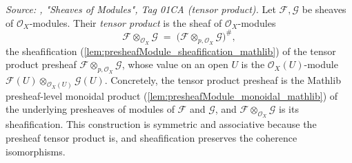 \begin{definition}\leanok
  \label{def:sheafTensorObj}
  \textit{Source: \cite{stacks-project}, "Sheaves of Modules", Tag 01CA (tensor
  product).}
  Let \(\mathcal{F}, \mathcal{G}\) be sheaves of \(\mathcal{O}_X\)-modules. Their
  \emph{tensor product} is the sheaf of \(\mathcal{O}_X\)-modules
  \[
    \mathcal{F} \otimes_{\mathcal{O}_X} \mathcal{G}
      \;=\; \bigl(\mathcal{F} \otimes_{p,\mathcal{O}_X} \mathcal{G}\bigr)^{\#},
  \]
  the sheafification (\cref{lem:presheafModule_sheafification_mathlib}) of the
  tensor product presheaf \(\mathcal{F} \otimes_{p,\mathcal{O}_X} \mathcal{G}\),
  whose value on an open \(U\) is the \(\mathcal{O}_X(U)\)-module
  \(\mathcal{F}(U) \otimes_{\mathcal{O}_X(U)} \mathcal{G}(U)\). Concretely, the
  tensor product presheaf is the Mathlib presheaf-level monoidal product
  (\cref{lem:presheafModule_monoidal_mathlib}) of the underlying presheaves of
  modules of \(\mathcal{F}\) and \(\mathcal{G}\), and
  \(\mathcal{F} \otimes_{\mathcal{O}_X} \mathcal{G}\) is its sheafification. This
  construction is symmetric and associative because the presheaf tensor product
  is, and sheafification preserves the coherence isomorphisms.
\end{definition}

